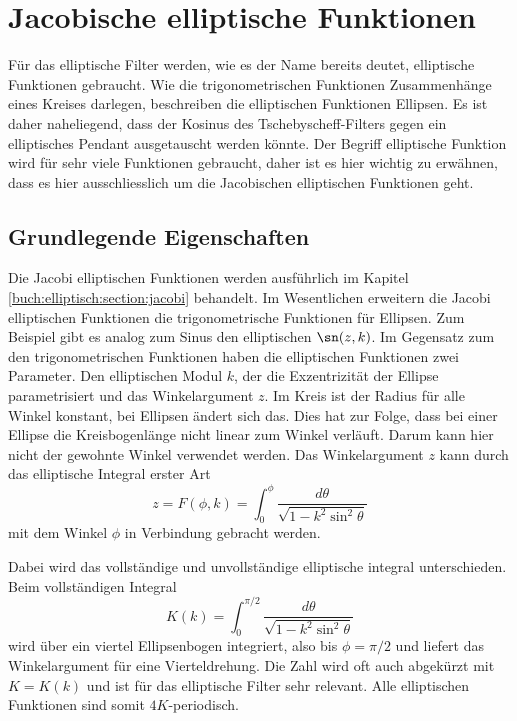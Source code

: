 \section{Jacobische elliptische Funktionen}

Für das elliptische Filter werden, wie es der Name bereits deutet, elliptische Funktionen gebraucht.
Wie die trigonometrischen Funktionen Zusammenhänge eines Kreises darlegen, beschreiben die elliptischen Funktionen Ellipsen.
Es ist daher naheliegend, dass der Kosinus des Tschebyscheff-Filters gegen ein elliptisches Pendant ausgetauscht werden könnte.
Der Begriff elliptische Funktion wird für sehr viele Funktionen gebraucht, daher ist es hier wichtig zu erwähnen, dass es hier ausschliesslich um die Jacobischen elliptischen Funktionen geht.

\subsection{Grundlegende Eigenschaften}

Die Jacobi elliptischen Funktionen werden ausführlich im Kapitel \ref{buch:elliptisch:section:jacobi} behandelt.
Im Wesentlichen erweitern die Jacobi elliptischen Funktionen die trigonometrische Funktionen für Ellipsen.
Zum Beispiel gibt es analog zum Sinus den elliptischen $\sn(z, k)$.
Im Gegensatz zum den trigonometrischen Funktionen haben die elliptischen Funktionen zwei Parameter.
Den elliptischen Modul $k$, der die Exzentrizität der Ellipse parametrisiert und das Winkelargument $z$.
Im Kreis ist der Radius für alle Winkel konstant, bei Ellipsen ändert sich das.
Dies hat zur Folge, dass bei einer Ellipse die Kreisbogenlänge nicht linear zum Winkel verläuft.
Darum kann hier nicht der gewohnte Winkel verwendet werden.
Das Winkelargument $z$ kann durch das elliptische Integral erster Art
\begin{equation}
    z
    =
    F(\phi, k)
    =
    \int_{0}^{\phi}
    \frac{
        d\theta
    }{
        \sqrt{
            1-k^2 \sin^2 \theta
        }
    }
\end{equation}
mit dem Winkel $\phi$ in Verbindung gebracht werden.

Dabei wird das vollständige und unvollständige elliptische integral unterschieden.
Beim vollständigen Integral
\begin{equation}
    K(k)
    =
    \int_{0}^{\pi / 2}
    \frac{
        d\theta
    }{
        \sqrt{
            1-k^2 \sin^2 \theta
        }
    }
\end{equation}
wird über ein viertel Ellipsenbogen integriert, also bis $\phi=\pi/2$ und liefert das Winkelargument für eine Vierteldrehung.
Die Zahl wird oft auch abgekürzt mit $K = K(k)$ und ist für das elliptische Filter sehr relevant.
Alle elliptischen Funktionen sind somit $4K$-periodisch.


